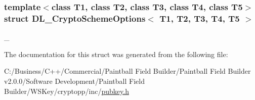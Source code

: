 \subsubsection*{template$<$class T1, class T2, class T3, class T4, class T5$>$ struct DL\_\-CryptoSchemeOptions$<$ T1, T2, T3, T4, T5 $>$}

\_\- 

The documentation for this struct was generated from the following file:\begin{DoxyCompactItemize}
\item 
C:/Business/C++/Commercial/Paintball Field Builder/Paintball Field Builder v2.0.0/Software Development/Paintball Field Builder/WSKey/cryptopp/inc/\hyperlink{pubkey_8h}{pubkey.h}\end{DoxyCompactItemize}
